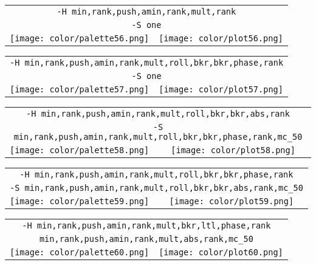 \documentclass{article}
\begin{document}
\begin{center}
\begin{tabular}{m{8cm}m{8cm}}
\multicolumn{2}{c}{\tt -H min,rank,push,amin,rank,mult,rank} \\
\multicolumn{2}{c}{\tt -S one} \\
\texttt{[image: color/palette56.png]} &
\texttt{[image: color/plot56.png]}
\end{tabular}
\end{center}

\begin{center}
\begin{tabular}{m{8cm}m{8cm}}
\multicolumn{2}{c}{\tt -H min,rank,push,amin,rank,mult,roll,bkr,bkr,phase,rank} \\
\multicolumn{2}{c}{\tt -S one} \\
\texttt{[image: color/palette57.png]} &
\texttt{[image: color/plot57.png]}
\end{tabular}
\end{center}

\begin{center}
\begin{tabular}{m{8cm}m{8cm}}
\multicolumn{2}{c}{\tt -H min,rank,push,amin,rank,mult,roll,bkr,bkr,abs,rank} \\
\multicolumn{2}{c}{\tt -S min,rank,push,amin,rank,mult,roll,bkr,bkr,phase,rank,mc\_50} \\
\texttt{[image: color/palette58.png]} &
\texttt{[image: color/plot58.png]}
\end{tabular}
\end{center}

\begin{center}
\begin{tabular}{m{8cm}m{8cm}}
\multicolumn{2}{c}{\tt -H min,rank,push,amin,rank,mult,roll,bkr,bkr,phase,rank} \\
\multicolumn{2}{c}{\tt -S min,rank,push,amin,rank,mult,roll,bkr,bkr,abs,rank,mc\_50} \\
\texttt{[image: color/palette59.png]} &
\texttt{[image: color/plot59.png]}
\end{tabular}
\end{center}

\begin{center}
\begin{tabular}{m{8cm}m{8cm}}
\multicolumn{2}{c}{\tt -H min,rank,push,amin,rank,mult,bkr,ltl,phase,rank} \\
\multicolumn{2}{c}{\tt min,rank,push,amin,rank,mult,abs,rank,mc\_50} \\
\texttt{[image: color/palette60.png]} &
\texttt{[image: color/plot60.png]}
\end{tabular}
\end{center}
\end{document}
